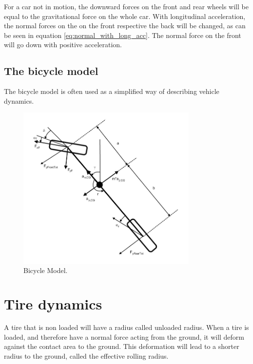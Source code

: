 For a car not in motion, the downward forces on the front and rear wheels will be equal to the gravitational force on the whole car. With longitudinal acceleration, the normal forces on the on the front respective the back will be changed, as can be seen in equation \ref{eq:normal_with_long_acc}. The normal force on the front will go down with positive acceleration. 



\subsection{The bicycle model}
The bicycle model is often used as a simplified way of describing vehicle dynamics.

\begin{figure}[h]
	\centering
	\includegraphics[width=0.8\textwidth]{Pictures/bicycle_model}
	\caption {Bicycle Model. \cite{fordonsdynamik99}}
	\label{bicycle_model}
\end{figure}

\section{Tire dynamics}

A tire that is non loaded will have a radius called unloaded radius. When a tire is loaded, and therefore have a normal force acting from the ground, it will deform against the contact area to the ground. This deformation will lead to a shorter radius to the ground, called the effective rolling radius. 

